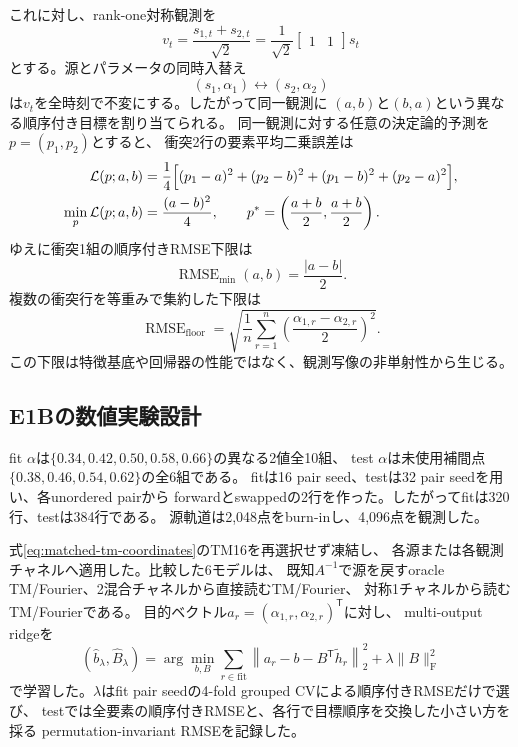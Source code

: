 \documentclass[a4paper,11pt]{jlreq}
\DeclareMathOperator{\RMSE}{RMSE}
\begin{document}
これに対し、rank-one対称観測を
\begin{equation}
    v_t
    =\frac{s_{1,t}+s_{2,t}}{\sqrt{2}}
    =\frac{1}{\sqrt{2}}
      \begin{bmatrix}1&1\end{bmatrix}s_t
    \label{eq:e1b-rank-one}
\end{equation}
とする。源とパラメータの同時入替え
\begin{equation}
    (s_1,\alpha_1)\longleftrightarrow(s_2,\alpha_2)
\end{equation}
は$v_t$を全時刻で不変にする。したがって同一観測に
$(a,b)$と$(b,a)$という異なる順序付き目標を割り当てられる。
同一観測に対する任意の決定論的予測を$p=(p_1,p_2)$とすると、
衝突2行の要素平均二乗誤差は
\begin{align}
    \mathcal L(p;a,b)
    &=\frac{1}{4}\Bigl[
      (p_1-a)^2+(p_2-b)^2
      +(p_1-b)^2+(p_2-a)^2
      \Bigr],\\
    \min_p\mathcal L(p;a,b)
    &=\frac{(a-b)^2}{4},
    \qquad
    p^{\ast}=\left(\frac{a+b}{2},\frac{a+b}{2}\right).
    \label{eq:e1b-collision-loss}
\end{align}
ゆえに衝突1組の順序付きRMSE下限は
\begin{equation}
    \RMSE_{\min}(a,b)=\frac{|a-b|}{2}.
    \label{eq:e1b-pair-floor}
\end{equation}
複数の衝突行を等重みで集約した下限は
\begin{equation}
    \RMSE_{\mathrm{floor}}
    =\sqrt{
       \frac{1}{n}
       \sum_{r=1}^{n}
       \left(\frac{\alpha_{1,r}-\alpha_{2,r}}{2}\right)^2
    }.
    \label{eq:e1b-global-floor}
\end{equation}
この下限は特徴基底や回帰器の性能ではなく、観測写像の非単射性から生じる。

\subsection{E1Bの数値実験設計}

fit $\alpha$は$\{0.34,0.42,0.50,0.58,0.66\}$の異なる2値全10組、
test $\alpha$は未使用補間点$\{0.38,0.46,0.54,0.62\}$の全6組である。
fitは16 pair seed、testは32 pair seedを用い、各unordered pairから
forwardとswappedの2行を作った。したがってfitは320行、testは384行である。
源軌道は2,048点をburn-inし、4,096点を観測した。

式\eqref{eq:matched-tm-coordinates}のTM16を再選択せず凍結し、
各源または各観測チャネルへ適用した。比較した6モデルは、
既知$A^{-1}$で源を戻すoracle TM/Fourier、2混合チャネルから直接読むTM/Fourier、
対称1チャネルから読むTM/Fourierである。
目的ベクトル$a_r=(\alpha_{1,r},\alpha_{2,r})^{\mathsf T}$に対し、
multi-output ridgeを
\begin{equation}
    (\widehat b_{\lambda},\widehat B_{\lambda})
    =\arg\min_{b,B}
      \sum_{r\in\mathrm{fit}}
      \left\|a_r-b-B^{\mathsf T}\widetilde h_r\right\|_2^2
      +\lambda\|B\|_{\mathrm F}^2
    \label{eq:e1b-multi-ridge}
\end{equation}
で学習した。$\lambda$はfit pair seedの4-fold grouped CVによる順序付きRMSEだけで選び、
testでは全要素の順序付きRMSEと、各行で目標順序を交換した小さい方を採る
permutation-invariant RMSEを記録した。
\end{document}
